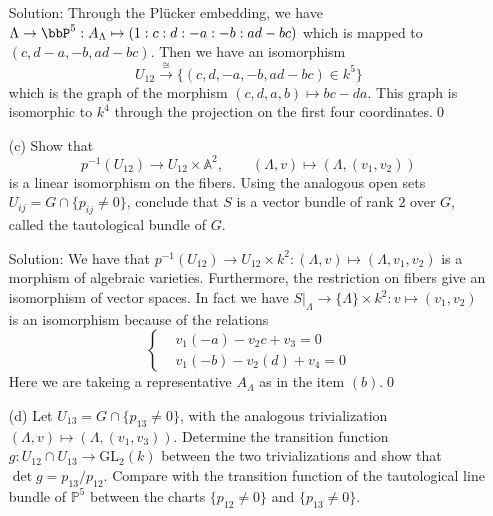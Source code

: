 \begin{enumerate}
Solution: Through the Plücker embedding, we have $\Lambda\to \bbP^5: A_\Lambda\mapsto (1:c:d:-a:-b:ad-bc)$
which is mapped to $(c,d-a,-b,ad-bc)$. Then we have an isomorphism 
\begin{equation}
    U_{12} \overset{\cong}{\rightarrow} \{(c,d,-a,-b,ad-bc)\in k^5\}
\end{equation} 
which is the graph of the morphism $(c,d,a,b)\mapsto bc-da$. This graph is isomorphic to $k^4$ through the projection 
on the first four coordinates.\qed

\item[(c)] Show that
\[
p^{-1}(U_{12})\longrightarrow U_{12}\times\mathbb{A}^2,\qquad (\Lambda,v)\longmapsto(\Lambda,(v_1,v_2))
\]
is a linear isomorphism on the fibers. Using the analogous open sets 
$U_{ij}=G\cap\{p_{ij}\neq 0\}$, 
conclude that $S$ is a vector bundle of rank $2$ over $G$, called the tautological bundle of $G$.\par 

Solution: We have that $p^{-1}(U_{12})\to U_{12}\times k^2:(\Lambda,v)\mapsto (\Lambda, v_1,v_2)$ 
is a morphism of algebraic varieties. Furthermore, the restriction on fibers give an isomorphism of vector spaces. 
In fact we have $S|_{\Lambda}\to \{\Lambda\}\times k^2: v\mapsto (v_1,v_2)$ is an isomorphism 
because of the relations 
\begin{equation}
    \left\{\begin{aligned}
        &v_1 (-a) -v_2 c +v_3 = 0\\
        &v_1 (-b) -v_2 (d) + v_4 = 0
    \end{aligned}\right.
\end{equation}
Here we are takeing a representative $A_\Lambda$ as in the item $(b)$.\qed


\item[(d)] Let $U_{13}=G\cap\{p_{13}\neq 0\}$, with the analogous 
trivialization $(\Lambda,v)\mapsto(\Lambda,(v_1,v_3))$. 
Determine the transition function $g\colon U_{12}\cap U_{13}\to\mathrm{GL}_2(k)$
 between the two trivializations and show that $\det g=p_{13}/p_{12}$. 
 Compare with the transition function of the tautological line bundle of $\mathbb{P}^5$ 
 between the charts $\{p_{12}\neq 0\}$ and $\{p_{13}\neq 0\}$.\par 


\end{enumerate}
